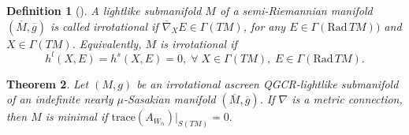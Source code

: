 \documentclass[reqno, 12pt]{amsart}
\numberwithin{equation}{section}
\newtheorem{theorem}{Theorem}[section]
\newtheorem{definition}[theorem]{Definition}
\begin{document}
\begin{definition}[\cite{ds2}]
{\rm
 A lightlike submanifold $M$ of a semi-Riemannian manifold $(\overline{M},\overline{g})$ is called irrotational if $\overline{\nabla}_{X}E\in\Gamma(TM)$, for any $E\in\Gamma(\mathrm{Rad} \, TM))$ and $X\in\Gamma(TM)$. Equivalently, $M$ is irrotational if 
\begin{equation}\label{ms40}
 h^{l}(X,E)= h^{s}(X,E)=0, \;\forall \; X\in\Gamma(TM),\; E\in\Gamma(\mathrm{Rad} \,TM).
\end{equation} 
}
\end{definition}

\begin{theorem}
 Let $(M,g)$ be an irrotational ascreen QGCR-lightlike submanifold of an indefinite nearly $\mu$-Sasakian manifold $(\overline{M},\overline{g})$. If  $\nabla$ is a metric connection, then $M$ is minimal if $\mathrm{trace}(A_{W_{\alpha}})|_{S(TM)}=0.$
\end{theorem}
\end{document}
